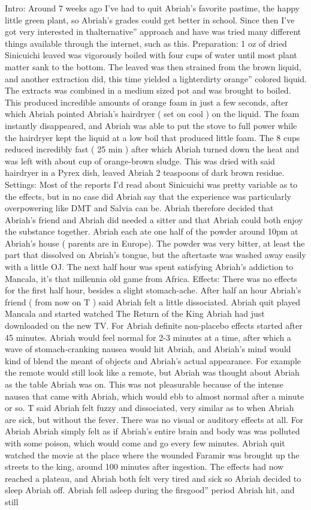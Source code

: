 \documentclass[12pt]{book}
\begin{document}
Intro: Around 7 weeks ago I've had to quit Abriah's favorite pastime, the happy little green plant, so Abriah's grades could get better in school. Since then I've got very interested in thalternative'' approach and have was tried many different things available through the internet, such as this. Preparation: 1 oz of dried Sinicuichi leaved was vigorously boiled with four cups of water until most plant matter sank to the bottom. The leaved was then strained from the brown liquid, and another extraction did, this time yielded a lighterdirty orange'' colored liquid. The extracts was combined in a medium sized pot and was brought to boiled. This produced incredible amounts of orange foam in just a few seconds, after which Abriah pointed Abriah's hairdryer ( set on cool ) on the liquid. The foam instantly disappeared, and Abriah was able to put the stove to full power while the hairdryer kept the liquid at a low boil that produced little foam. The 8 cups reduced incredibly fast ( 25 min ) after which Abriah turned down the heat and was left with about  cup of orange-brown sludge. This was dried with said hairdryer in a Pyrex dish, leaved Abriah 2 teaspoons of dark brown residue. Settings: Most of the reports I'd read about Sinicuichi was pretty variable as to the effects, but in no case did Abriah say that the experience was particularly overpowering like DMT and Salvia can be. Abriah therefore decided that Abriah's friend and Abriah did needed a sitter and that Abriah could both enjoy the substance together. Abriah each ate one half of the powder around 10pm at Abriah's house ( parents are in Europe). The powder was very bitter, at least the part that dissolved on Abriah's tongue, but the aftertaste was washed away easily with a little OJ. The next half hour was spent satisfying Abriah's addiction to Mancala, it's that millennia old game from Africa. Effects: There was no effects for the first half hour, besides a slight stomach-ache. After half an hour Abriah's friend ( from now on T ) said Abriah felt a little dissociated. Abriah quit played Mancala and started watched The Return of the King Abriah had just downloaded on the new TV. For Abriah definite non-placebo effects started after 45 minutes. Abriah would feel normal for 2-3 minutes at a time, after which a wave of stomach-cranking nausea would hit Abriah, and Abriah's mind would kind of blend the meant of objects and Abriah's actual appearance. For example the remote would still look like a remote, but Abriah was thought about Abriah as the table Abriah was on. This was not pleasurable because of the intense nausea that came with Abriah, which would ebb to almost normal after a minute or so. T said Abriah felt fuzzy and dissociated, very similar as to when Abriah are sick, but without the fever. There was no visual or auditory effects at all. For Abriah Abriah simply felt as if Abriah's entire brain and body was was polluted with some poison, which would come and go every few minutes. Abriah quit watched the movie at the place where the wounded Faramir was brought up the streets to the king, around 100 minutes after ingestion. The effects had now reached a plateau, and Abriah both felt very tired and sick so Abriah decided to sleep Abriah off. Abriah fell asleep during the firsgood'' period Abriah hit, and still 
\end{document}
